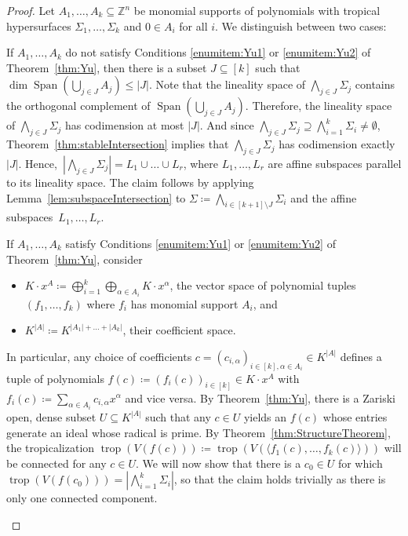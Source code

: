\documentclass[11pt]{article}
\theoremstyle{definition}
\numberwithin{equation}{section}
\newcommand{\ZZ}{\mathbb{Z}}
\DeclareMathOperator{\Span}{Span}
\DeclareMathOperator{\trop}{trop}
\begin{document}
\begin{proof}
  Let $A_1,\dots,A_k\subseteq\ZZ^n$ be monomial supports of polynomials with tropical hypersurfaces $\Sigma_1,\dots,\Sigma_k$ and $0\in A_i$ for all $i$. We distinguish between two cases:
  \begin{description}[leftmargin=0 pt]
  \item[Case 1] If $A_1,\dots,A_k$ do not satisfy Conditions \eqref{enumitem:Yu1} or \eqref{enumitem:Yu2} of Theorem~\ref{thm:Yu}, then there is a subset $J\subseteq [k]$ such that $\dim \Span (\bigcup_{j\in J} A_j)\leq |J|$.
    Note that the lineality space of $\bigwedge_{j\in J}\Sigma_j$ contains the orthogonal complement of $\Span (\bigcup_{j\in J} A_j)$. Therefore, the lineality space of $\bigwedge_{j\in J}\Sigma_j$ has codimension at most $|J|$. And since $\bigwedge_{j\in J}\Sigma_j\supseteq\bigwedge_{i=1}^k\Sigma_i \neq\emptyset$, Theorem~\ref{thm:stableIntersection} implies that $\bigwedge_{j\in J}\Sigma_j$ has codimension exactly $|J|$. Hence,~$|\bigwedge_{j\in J}\Sigma_j|=L_1\cup \dots\cup L_r$, where $L_1,\dots,L_r$ are affine subspaces parallel to its lineality space. The claim follows by applying Lemma~\ref{lem:subspaceIntersection} to $\Sigma\coloneqq\bigwedge_{i\in [k+1]\setminus J}\Sigma_i$ and the affine subspaces~$L_1,\dots,L_r$.
  \item[Case 2] If $A_1,\dots,A_k$ satisfy Conditions \eqref{enumitem:Yu1} or \eqref{enumitem:Yu2} of Theorem~\ref{thm:Yu}, consider
  \begin{itemize}
  \item $K\cdot x^A\coloneqq \bigoplus_{i=1}^k \bigoplus_{\alpha\in A_i} K\cdot x^{\alpha}$, the vector space of polynomial tuples $(f_1,\dots,f_k)$ where $f_i$ has monomial support $A_i$, and
  \item $K^{|A|}\coloneqq K^{|A_1|+\dots+|A_k|}$, their coefficient space.
  \end{itemize}
  In particular, any choice of coefficients $c=(c_{i,\alpha})_{i\in [k], \alpha\in A_i}\in K^{|A|}$ defines a tuple of polynomials $f(c)\coloneqq (f_i(c))_{i\in [k]}\in K\cdot x^A$ with $f_i(c)\coloneqq\sum_{\alpha\in A_i}c_{i,\alpha}x^\alpha$ and vice versa. By Theorem~\ref{thm:Yu}, there is a Zariski open, dense subset $U\subseteq K^{|A|}$ such that any $c\in U$ yields an $f(c)$ whose entries generate an ideal whose radical is prime. By Theorem~\ref{thm:StructureTheorem}, the tropicalization $\trop(V(f(c)))\coloneqq \trop(V(\langle f_1(c),\dots,f_k(c)\rangle))$ will be connected for any $c\in U$. We will now show that there is a $c_0\in U$ for which $\trop(V(f(c_0)))=|\bigwedge_{i=1}^k\Sigma_i|$, so that the claim holds trivially as there is only one connected component.


\end{description}
\end{proof}
\end{document}
